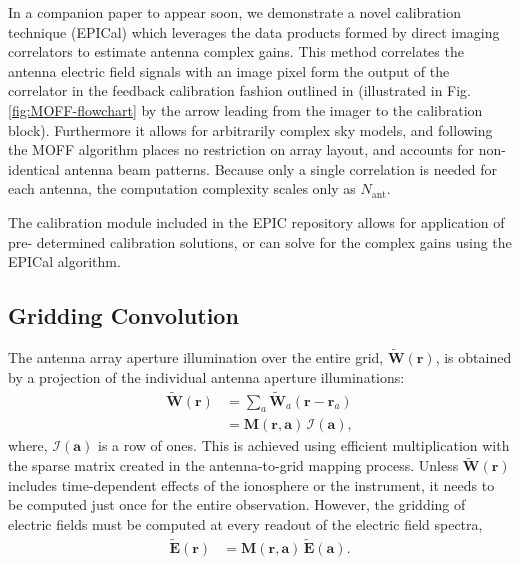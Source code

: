\documentclass[a4paper,fleqn,usenatbib]{../mnras}
\begin{document}
In a companion paper to appear soon, we demonstrate a novel calibration 
technique (EPICal) which leverages the data products formed by direct imaging 
correlators to estimate antenna complex gains. This method correlates the antenna 
electric field signals with an image pixel form the output of the correlator in the 
feedback calibration fashion outlined in \citealt{mor11} (illustrated in Fig. 
\ref{fig:MOFF-flowchart} by the arrow leading from the imager to the calibration 
block). Furthermore it allows for arbitrarily complex sky models, and following the 
MOFF algorithm places no restriction on array layout, and accounts for non-identical 
antenna beam patterns. Because only a single correlation is needed for each 
antenna, the computation complexity scales only as $N_{\mathrm{ant}}$. 

The calibration module included in the EPIC repository allows for application of pre-
determined calibration solutions, or can solve for the complex gains using the 
EPICal algorithm.

\subsection{Gridding Convolution}

The antenna array aperture illumination over the entire grid,
$\widetilde{\mathbf{W}}(\mathbf{r})$, is obtained by a projection of the individual
antenna aperture illuminations:
\begin{align}\label{eqn:gridding-convolution}
  \widetilde{\mathbf{W}}(\mathbf{r}) &= \sum_a \widetilde{\mathbf{W}}_a(\mathbf{r}-\mathbf{r}_a) \\
                            &= \mathbf{M}(\mathbf{r},\mathbf{a})\,\mathcal{I}(\mathbf{a}),
\end{align}
where, $\mathcal{I}(\mathbf{a})$ is a row of ones. This is achieved using
efficient multiplication with the sparse matrix created in the antenna-to-grid
mapping process. Unless $\widetilde{\mathbf{W}}(\mathbf{r})$ includes time-dependent
effects of the ionosphere or the instrument, it needs to be computed just once
for the entire observation. However, the gridding of electric fields must be
computed at every readout of the electric field spectra,
\begin{align}
  \widetilde{\mathbf{E}}(\mathbf{r}) &= \mathbf{M}(\mathbf{r},\mathbf{a})\,\widetilde{\mathbf{E}}(\mathbf{a}).
\end{align}
\end{document}
